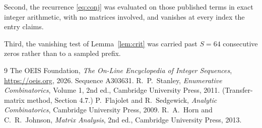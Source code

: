 \documentclass[11pt,a4paper]{article}
\theoremstyle{plain}
\theoremstyle{definition}
\begin{document}
Second, the recurrence \eqref{eq:conj} was evaluated on those published terms in exact
integer arithmetic, with no matrices involved, and vanishes at every index the entry claims.

Third, the vanishing test of Lemma~\ref{lem:crit} was carried past $S=64$ consecutive
zeros rather than to a sampled prefix.

\begin{thebibliography}{9}
 The OEIS Foundation, \emph{The On-Line Encyclopedia of Integer
Sequences}, \url{https://oeis.org}, 2026. Sequence A303631.
 R.~P.~Stanley, \emph{Enumerative Combinatorics}, Volume 1, 2nd ed.,
Cambridge University Press, 2011. (Transfer-matrix method, Section 4.7.)
 P.~Flajolet and R.~Sedgewick, \emph{Analytic Combinatorics}, Cambridge
University Press, 2009.
 R.~A.~Horn and C.~R.~Johnson, \emph{Matrix Analysis}, 2nd ed., Cambridge
University Press, 2013.
\end{thebibliography}
\end{document}
